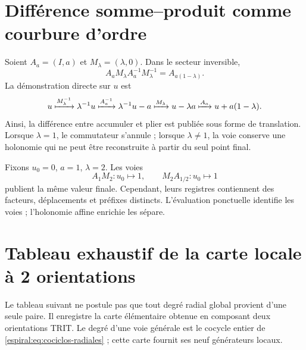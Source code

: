 \section{Différence somme--produit comme courbure d'ordre}

Soient \(A_a=(I,a)\) et \(M_\lambda=(\lambda,0)\). Dans le secteur inversible,
\[
 A_aM_\lambda A_a^{-1}M_\lambda^{-1}
 =A_{a(1-\lambda)}.
\]
La démonstration directe sur \(u\) est
\[
 u\xmapsto{M_\lambda^{-1}}\lambda^{-1}u
 \xmapsto{A_a^{-1}}\lambda^{-1}u-a
 \xmapsto{M_\lambda}u-\lambda a
 \xmapsto{A_a}u+a(1-\lambda).
\]
Ainsi, la différence entre accumuler et plier est publiée sous forme de translation. Lorsque \(\lambda=1\), le commutateur s'annule ; lorsque \(\lambda\neq1\), la voie conserve une holonomie qui ne peut être reconstruite à partir du seul point final.

\begin{example}
Fixons \(u_0=0\), \(a=1\), \(\lambda=2\). Les voies
\[
 A_1M_2:u_0\longmapsto1,
 \qquad
 M_2A_{1/2}:u_0\longmapsto1
\]
publient la même valeur finale. Cependant, leurs registres contiennent des facteurs, déplacements et préfixes distincts. L'évaluation ponctuelle identifie les voies ; l'holonomie affine enrichie les sépare.
\end{example}

\section{Tableau exhaustif de la carte locale à 2 orientations}

Le tableau suivant ne postule pas que tout degré radial global provient d'une seule paire. Il enregistre la carte élémentaire obtenue en composant deux orientations TRIT. Le degré d'une voie générale est le cocycle entier de \cref{espiral:eq:cociclos-radiales} ; cette carte fournit ses neuf générateurs locaux.

